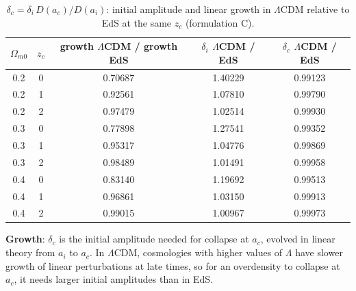 \documentclass[11pt,a4paper]{article}
\begin{document}
\begin{table}[htbp]
\centering
\caption{$\delta_c=\delta_i\,D(a_c)/D(a_i)$: initial amplitude and linear growth in $\Lambda$CDM relative to EdS at the same $z_c$ (formulation C).}
\label{tab:growth}
\small
\begin{tabular}{c c c c c}
\toprule
$\Omega_{m0}$ & $z_c$ & growth $\Lambda$CDM / growth EdS & $\delta_i$ $\Lambda$CDM / EdS & $\delta_c$ $\Lambda$CDM / EdS\\
\midrule
0.2 & 0 & 0.70687 & 1.40229 & 0.99123\\
0.2 & 1 & 0.92561 & 1.07810 & 0.99790\\
0.2 & 2 & 0.97479 & 1.02514 & 0.99930\\
0.3 & 0 & 0.77898 & 1.27541 & 0.99352\\
0.3 & 1 & 0.95317 & 1.04776 & 0.99869\\
0.3 & 2 & 0.98489 & 1.01491 & 0.99958\\
0.4 & 0 & 0.83140 & 1.19692 & 0.99513\\
0.4 & 1 & 0.96861 & 1.03150 & 0.99913\\
0.4 & 2 & 0.99015 & 1.00967 & 0.99973\\
\bottomrule
\end{tabular}
\end{table}

\textbf{Growth}: $\delta_c$ is the initial amplitude needed for collapse at $a_c$, evolved in linear theory from $a_i$ to $a_c$. In $\Lambda$CDM, cosmologies with higher values of $\Lambda$ have slower growth of linear perturbations at late times, so for an overdensity to collapse at $a_c$, it needs larger initial amplitudes than in EdS.
\end{document}
